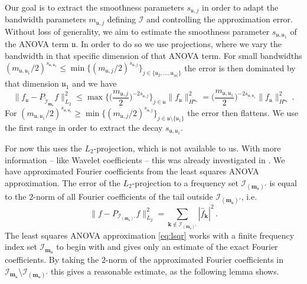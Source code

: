 \documentclass[a4paper]{scrartcl}
\numberwithin{equation}{section}
\renewcommand{\tilde}{\widetilde}
\begin{document}
Our goal is to extract the smoothness parameters $s_{\mathfrak u,j}$ in order to adapt the bandwidth parameters $m_{\mathfrak u,j}$ defining $\mathcal I$ and controlling the approximation error.
Without loss of generality, we aim to estimate the smoothness parameter $s_{\mathfrak u,\mathfrak u_1}$ of the ANOVA term $\mathfrak u$.
In order to do so we use projections, where we vary the bandwidth in that specific dimension of that ANOVA term.
For small bandwidths $(m_{\mathfrak u,\mathfrak u_1}/2)^{s_{\mathfrak u,\mathfrak u_1}}\le \min \{(m_{\mathfrak u,j}/2)^{s_{\mathfrak u,j}}\}_{j\in \{\mathfrak u_2,\dots,\mathfrak u_{|\mathfrak u|}\}}$ the error is then dominated by that dimension $\mathfrak u_1$ and we have
\begin{equation}\label{eq:kittchen}
    \|f_{\mathfrak u}-P_{\tilde{\mathcal I}_{\bm m_{\mathfrak u}}} f\|_{L_2}^2
    \le \max \Big\{\Big(\frac{m_{\mathfrak u,j}}{2}\Big)^{-2s_{\mathfrak u,j}}\Big\}_{j\in \mathfrak u} \|f_{\mathfrak u}\|_{H^{\bm s_{\mathfrak u}}}^2
    = \Big(\frac{m_{\mathfrak u,\mathfrak u_1}}{2}\Big)^{-2s_{\mathfrak u,\mathfrak u_1}} \|f_{\mathfrak u}\|_{H^{\bm s_{\mathfrak u}}}^2 \,.
\end{equation}
For $(m_{\mathfrak u,\mathfrak u_1}/2)^{s_{\mathfrak u,\mathfrak u_1}}\ge \min \{(m_{\mathfrak u,j}/2)^{s_{\mathfrak u,j}}\}_{j\in \mathfrak u\setminus\{\mathfrak u_1\}}$ the error then flattens.
We use the first range in order to extract the decay $s_{\mathfrak u,\mathfrak u_1}$.

For now this uses the $L_2$-projection, which is not available to us.
With more information -- like Wavelet coefficients -- this was already investigated in \cite{SUV21}.
We have approximated Fourier coefficients from the least squares ANOVA approximation.
The error of the $L_2$-projection to a frequency set $\mathcal I_{(\bm m_{\mathfrak u})'}$ is equal to the $2$-norm of all Fourier coefficients of the tail outside $\mathcal I_{(\bm m_{\mathfrak u})'}$, i.e.
\begin{equation*}
    \|f-P_{\mathcal I_{(\bm m_{\mathfrak u})'} } f\|_{L_2}^2
    = \sum_{\bm k\notin \mathcal I_{(\bm m_{\mathfrak u})'} } |\hat f_{\bm k}|^2 \,.
\end{equation*}
The least squares ANOVA approximation \eqref{eq:lsqr} works with a finite frequency index set $\mathcal I_{\bm m_{\mathfrak u}}$ to begin with and gives only an estimate of the exact Fourier coefficients.
By taking the $2$-norm of the approximated Fourier coefficients in $\mathcal I_{\bm m_{\mathfrak u}}\setminus \mathcal I_{(\bm m_{\mathfrak u})'}$ this gives a reasonable estimate, as the following lemma shows.
\end{document}
